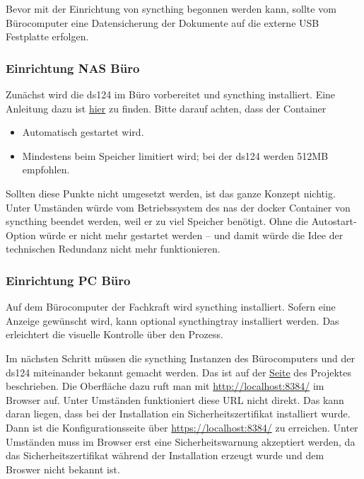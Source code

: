 Bevor mit der Einrichtung von \gls{syncthing} begonnen werden kann, sollte
vom Bürocomputer eine Datensicherung der Dokumente auf die externe USB
Festplatte erfolgen.

\subsubsection{Einrichtung NAS Büro}

Zunächst wird die \gls{ds124} im Büro vorbereitet und \gls{syncthing}
installiert. Eine Anleitung dazu ist
\href{https://github.com/ThirtySomething/NAS-Information}{hier}
zu finden. Bitte darauf achten, dass der Container

\begin{itemize}
    \item Automatisch gestartet wird.
    \item Mindestens beim Speicher limitiert wird; bei der \gls{ds124} werden
          512MB empfohlen.
\end{itemize}

Sollten diese Punkte nicht umgesetzt werden, ist das ganze Konzept nichtig.
Unter Umständen würde vom Betriebssystem des \gls{nas} der \gls{docker}
Container von \gls{syncthing} beendet werden, weil er zu viel Speicher benötigt.
Ohne die Autostart-Option würde er nicht mehr gestartet werden -- und damit
würde die Idee der technischen Redundanz nicht mehr funktionieren.

\subsubsection{Einrichtung PC Büro}

Auf dem Bürocomputer der Fachkraft wird \gls{syncthing} installiert. Sofern
eine Anzeige gewünscht wird, kann optional \gls{syncthingtray}
installiert werden. Das erleichtert die visuelle Kontrolle über den Prozess.
\bigskip

Im nächsten Schritt müssen die \gls{syncthing} Instanzen des Bürocomputers und
der \gls{ds124} miteinander bekannt gemacht werden. Das ist auf der
\href{https://docs.syncthing.net/intro/getting-started.html}{Seite} des
Projektes beschrieben. Die Oberfläche dazu ruft man mit
\href{http://localhost:8384/}{http://localhost:8384/} im Browser auf. Unter
Umständen funktioniert diese URL nicht direkt. Das kann daran liegen, dass bei
der Installation ein Sicherheitszertifikat installiert wurde. Dann ist die
Konfigurationsseite über \href{https://localhost:8384/}{https://localhost:8384/}
zu erreichen.  Unter Umständen muss im Browser erst eine
Sicherheitswarnung akzeptiert werden, da das Sicherheitszertifikat während
der Installation erzeugt wurde und dem Broswer nicht bekannt ist.
\bigskip

